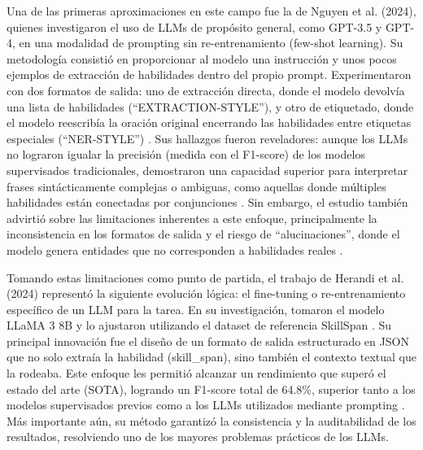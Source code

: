 Una de las primeras aproximaciones en este campo fue la de Nguyen et al. (2024), quienes investigaron el uso de LLMs de propósito general, como GPT-3.5 y GPT-4, en una modalidad de prompting sin re-entrenamiento (few-shot learning). Su metodología consistió en proporcionar al modelo una instrucción y unos pocos ejemplos de extracción de habilidades dentro del propio prompt. Experimentaron con dos formatos de salida: uno de extracción directa, donde el modelo devolvía una lista de habilidades (``EXTRACTION-STYLE''), y otro de etiquetado, donde el modelo reescribía la oración original encerrando las habilidades entre etiquetas especiales (``NER-STYLE'') \parencite{nguyen2024}. Sus hallazgos fueron reveladores: aunque los LLMs no lograron igualar la precisión (medida con el F1-score) de los modelos supervisados tradicionales, demostraron una capacidad superior para interpretar frases sintácticamente complejas o ambiguas, como aquellas donde múltiples habilidades están conectadas por conjunciones \parencite{nguyen2024}. Sin embargo, el estudio también advirtió sobre las limitaciones inherentes a este enfoque, principalmente la inconsistencia en los formatos de salida y el riesgo de ``alucinaciones'', donde el modelo genera entidades que no corresponden a habilidades reales \parencite{nguyen2024}.

Tomando estas limitaciones como punto de partida, el trabajo de Herandi et al. (2024) representó la siguiente evolución lógica: el fine-tuning o re-entrenamiento específico de un LLM para la tarea. En su investigación, tomaron el modelo LLaMA 3 8B y lo ajustaron utilizando el dataset de referencia SkillSpan \parencite{herandi2024}. Su principal innovación fue el diseño de un formato de salida estructurado en JSON que no solo extraía la habilidad (skill\_span), sino también el contexto textual que la rodeaba. Este enfoque les permitió alcanzar un rendimiento que superó el estado del arte (SOTA), logrando un F1-score total de 64.8\%, superior tanto a los modelos supervisados previos como a los LLMs utilizados mediante prompting \parencite{herandi2024}. Más importante aún, su método garantizó la consistencia y la auditabilidad de los resultados, resolviendo uno de los mayores problemas prácticos de los LLMs.

